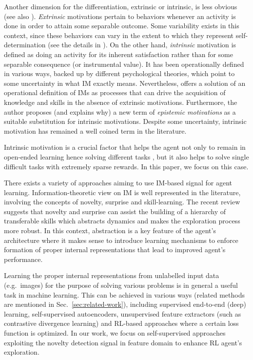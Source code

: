 \documentclass[a4paper,11pt]{elsarticle}
\begin{document}
Another dimension for the differentiation, extrinsic or intrinsic, is less obvious (see also \citep{Morris2022}).
\textit{Extrinsic} motivations pertain to behaviors whenever an activity is done in order to attain some separable outcome. Some variability exists in this context, since these behaviors can vary in the extent to which they represent self-determination (see the details in \citep{Ryan00}).
On the other hand, \textit{intrinsic} motivation is defined as doing an activity for its inherent satisfaction rather than for some separable consequence (or instrumental value). It has been operationally defined in various ways, backed up by different psychological theories, which point to some uncertainty in what IM exactly means. Nevertheless,
\citep{Baldassarre19} offers a solution of an operational definition of IMs as processes that can drive the acquisition of knowledge and skills in the absence of extrinsic motivations. Furthermore, the author proposes (and explains why) a new term of \textit{epistemic motivations} as a suitable substitution for intrinsic motivations. 
Despite some uncertainty, intrinsic motivation has remained a well coined term in the literature.

Intrinsic motivation is a crucial factor that helps the agent not only to remain in open-ended learning hence solving different tasks \citep{Parisi2019}, but it also helps
to solve single difficult tasks with extremely sparse rewards. In this paper, we focus on this case.

There exists a variety of approaches aiming to use IM-based signal for agent learning. Information-theoretic view on IM is well represented in the literature,  involving the concepts of novelty, surprise and skill-learning. The recent review \citep{Aubret2023} suggests that novelty and surprise can assist the building of a hierarchy of transferable skills which abstracts dynamics and makes the exploration process more robust. In this context, abstraction is a key feature of the agent's architecture where it makes sense to introduce learning mechanisms to enforce formation of proper internal representations that lead to improved agent's performance. 

Learning the proper internal representations from unlabelled input data (e.g.~images) for the purpose of solving various problems is in general a useful task in machine learning. This can be achieved in various ways (related methods are mentioned in Sec.~\ref{sec:related-work}), including supervised end-to-end (deep) learning, self-supervised autoencoders, unsupervised feature extractors (such as contrastive divergence learning) and RL-based approaches where a certain loss function is optimized.
In our work, we focus on self-supervised approaches exploiting the novelty detection signal in feature domain to enhance RL agent's exploration.
\end{document}
